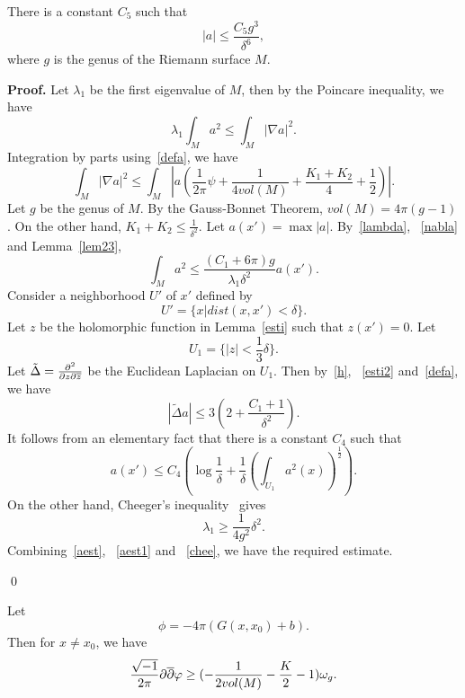 \begin{lemma}\label{lema}
There is a constant $C_5$ such that
\[
|a|\leq\frac{C_5g^3}{\delta^6},
\]
where $g$ is the genus of the Riemann surface $M$.
\end{lemma}

{\bf Proof.} Let $\lambda_1$ be the first eigenvalue of $M$, then 
by the Poincare inequality,
we have
\begin{equation}\label{lambda}
\lambda_1\int_M a^2\leq\int_M|\nabla a|^2.
\end{equation}
Integration by parts using~\eqref{defa}, we have
\begin{equation}\label{nabla}
\int_M|\nabla a|^2\leq\int_M |a(\frac{1}{2\pi}\psi+\frac{1}{4vol(M)}
+\frac{
K_1+K_2}{4}+\frac 12)|.
\end{equation}
Let $g$ be the genus of $M$.
By the Gauss-Bonnet Theorem, $vol(M)=4\pi(g-1)$. On the other hand,
$K_1+K_2\leq\frac{1}{\delta^2}$. Let $a(x')=\max |a|$.
By~\eqref{lambda}, ~\eqref{nabla} and Lemma~\ref{lem23},
\begin{equation}\label{aest}
\int_M a^2\leq\frac{(C_1+6\pi)g}{\lambda_1\delta^2}a(x').
\end{equation}
Consider a neighborhood $U'$ of $x'$ defined by 
\[
U'=\{ x| dist (x,x')	<\delta\}.
\]
Let $z$ be the holomorphic function in Lemma~\ref{esti} such that
$z(x')=0$. Let
\[
U_1=\{|z|<\frac 13\delta\}.
\]
Let $\tilde\Delta=\frac{\partial^2}{\partial z\partial\overline z}$ be the Euclidean Laplacian
on $U_1$. Then by~\eqref{h}, ~\eqref{esti2} and~\eqref{defa}, we have
\begin{equation}
|\tilde\Delta a|\leq 3(2+\frac{C_1+1}{\delta^2}).
\end{equation}
It follows from an elementary fact that there is a constant $C_4$
such that
\begin{equation}\label{aest1}
a(x')\leq C_4(\log\frac 1\delta
+\frac{1}{\delta}
(\int_{U_1} a^2(x))^{\frac 12}).
\end{equation}
On the other hand, Cheeger's inequality~\cite[page 91]{SY} gives
\begin{equation}\label{chee}
\lambda_1\geq\frac{1}{4g^2}\delta^2.
\end{equation}
Combining~\eqref{aest},
~\eqref{aest1} and ~\eqref{chee}, we have the
required estimate.

\qed



Let 
\begin{equation}\label{phi1}
\phi=-4\pi(G(x,x_0)+b).
\end{equation}
Then for $x\neq x_0$, we have
\begin{equation}\label{pine}
\frac{\sqrt{-1}}{2\pi}\partial\overline{\partial}\varphi\geq
(-\frac{1}{2vol(M)}-\frac K2-1)\omega_g.
\end{equation}

